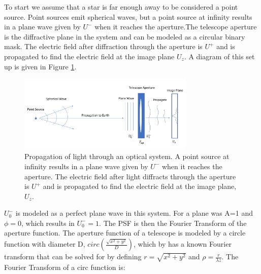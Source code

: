 To start we assume that a star is far enough away to be considered a point source. Point sources emit spherical waves, but a point source at infinity results in a plane wave given by $U^-$ when it reaches the aperture.The telescope aperture is the diffractive plane in the system and can be modeled as a circular binary mask. The electric field after diffraction through the aperture is $U^+$ and is propagated to find the electric field at the image plane $U_z$. A diagram of this set up is given in Figure \ref{fig:propagation}. 

\begin{figure}
    \centering
    \includegraphics[width=0.75\textwidth]{Chapter Materials/Introduction Materials/Introduction Figures/Propagation.png}
    \caption{Propagation of light through an optical system. A point source at infinity results in a plane wave given by $U^-$ when it reaches the aperture. The electric field after light diffracts through the aperture is $U^+$ and is propagated to find the electric field at the image plane, $U_z$.}
    \label{fig:propagation}
\end{figure}

$U_0^-$ is modeled as a perfect plane wave in this system. For a plane was A=1 and $\phi =0$, which results in $U_0^-=1$. The PSF is then the Fourier Transform of the aperture function. The aperture function of a telescope is modeled by a circle function with diameter D, $circ(\frac{\sqrt{x^2+y^2}}{D})$, which by has a known Fourier transform that can be solved for by defining $r=\sqrt{x^2+y^2}$ and $\rho=\frac{r}{\lambda z}$. The Fourier Transform of a circ function is:



